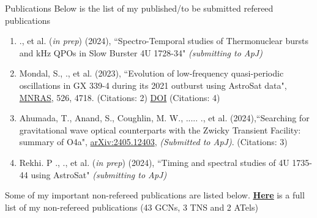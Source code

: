 \vspace{-0.7em}
\begin{section}{Publications}
    Below is the list of my published/to be submitted refereed publications
    \vspace{-0.3em}
    \begin{enumerate}
        \item \me., et al. (\textit{in prep}) (2024), {``Spectro-Temporal studies of Thermonuclear bursts and kHz QPOs in Slow Burster 4U 1728-34"} \textit{(submitting to ApJ)}
        \vspace{-0.2em}

        \item Mondal, S., \me., et al. (2023), {``Evolution of low-frequency quasi-periodic oscillations in GX 339-4 during its 2021 outburst using AstroSat data"}, \href{https://ui.adsabs.harvard.edu/link_gateway/2023MNRAS.526.4718M/doi:10.1093/mnras/stad3079}{MNRAS}, 526, 4718. (Citations: 2) {\href{https://doi.org/10.1093/mnras/stad3079}{DOI}} (Citations: 4)
        \vspace{-0.2em}

        \item Ahumada, T., Anand, S., Coughlin, M. W., ..... \me ., et al. (2024),{``Searching for gravitational wave optical counterparts with the Zwicky Transient Facility: summary of O4a"}, \href{https://arxiv.org/pdf/2405.12403}{arXiv:2405.12403}, \textit{(Submitted to ApJ)}. (Citations: 3)
        \vspace{-0.2em}

        \item Rekhi. P ., \me., et al. (\textit{in prep}) (2024), {``Timing and spectral studies of 4U 1735-44 using AstroSat"} \textit{(submitting to ApJ)}
        \vspace{-0.2em}
    \end{enumerate}

    Some of my important non-refereed publications are listed below. \href{https://ui.adsabs.harvard.edu/search/filter_database_fq_database=AND&filter_database_fq_database=database%3A%22astronomy%22&filter_property_fq_property=AND&filter_property_fq_property=property%3A%22notrefereed%22&fq=%7B!type%3Daqp%20v%3D%24fq_database%7D&fq=%7B!type%3Daqp%20v%3D%24fq_property%7D&fq_database=(database%3A%22astronomy%22)&fq_property=(property%3A%22notrefereed%22)&p_=0&q=Anirudh%20Salgundi&sort=date%20desc%2C%20bibcode%20desc}{\textbf{\underline{\textcolor{navyblue}{Here}}}} is a full list of my non-refereed publications (43 GCNs, 3 TNS and 2 ATels)


\end{section}
